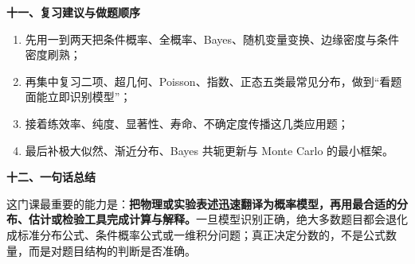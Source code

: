 \textbf{十一、复习建议与做题顺序}

\begin{enumerate}
  \item 先用一到两天把条件概率、全概率、Bayes、随机变量变换、边缘密度与条件密度刷熟；
  \item 再集中复习二项、超几何、Poisson、指数、正态五类最常见分布，做到“看题面能立即识别模型”；
  \item 接着练效率、纯度、显著性、寿命、不确定度传播这几类应用题；
  \item 最后补极大似然、渐近分布、Bayes 共轭更新与 Monte Carlo 的最小框架。
\end{enumerate}

\textbf{十二、一句话总结}

这门课最重要的能力是：\textbf{把物理或实验表述迅速翻译为概率模型，再用最合适的分布、估计或检验工具完成计算与解释。}一旦模型识别正确，绝大多数题目都会退化成标准分布公式、条件概率公式或一维积分问题；真正决定分数的，不是公式数量，而是对题目结构的判断是否准确。

